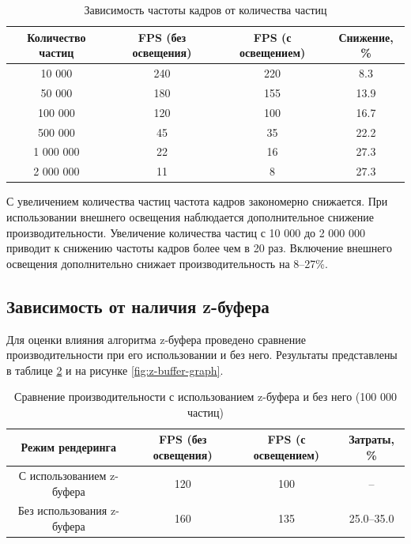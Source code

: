 \begin{table}[h!]
	\centering
	\caption{Зависимость частоты кадров от количества частиц}
	\label{tab:fps-particles}
	\begin{tabular}{|c|c|c|c|}
		\hline
		\textbf{Количество частиц} & \textbf{FPS (без освещения)} & \textbf{FPS (с освещением)} & \textbf{Снижение, \%} \\ \hline
		10 000  & 240 & 220 & 8.3 \\ \hline
		50 000  & 180 & 155 & 13.9 \\ \hline
		100 000 & 120 & 100 & 16.7 \\ \hline
		500 000 & 45  & 35  & 22.2 \\ \hline
		1 000 000 & 22 & 16 & 27.3 \\ \hline
		2 000 000 & 11 & 8  & 27.3 \\ \hline
	\end{tabular}
\end{table}

С увеличением количества частиц частота кадров закономерно снижается. При использовании внешнего освещения наблюдается дополнительное снижение производительности. Увеличение количества частиц с 10 000 до 2 000 000 приводит к снижению частоты кадров более чем в 20 раз. Включение внешнего освещения дополнительно снижает производительность на 8–27\%.

	\subsection{Зависимость от наличия z-буфера}

Для оценки влияния алгоритма z-буфера проведено сравнение производительности при его использовании и без него. Результаты представлены в таблице \ref{tab:z-buffer} и на рисунке \ref{fig:z-buffer-graph}.

\begin{table}[h!]
	\centering
	\caption{Сравнение производительности с использованием z-буфера и без него (100 000 частиц)}
	\label{tab:z-buffer}
	\begin{tabular}{|c|c|c|c|}
		\hline
		\textbf{Режим рендеринга} & \textbf{FPS (без освещения)} & \textbf{FPS (с освещением)} & \textbf{Затраты, \%} \\ \hline
		С использованием z-буфера & 120 & 100 & -- \\ \hline
		Без использования z-буфера & 160 & 135 & 25.0–35.0 \\ \hline
	\end{tabular}
\end{table}

